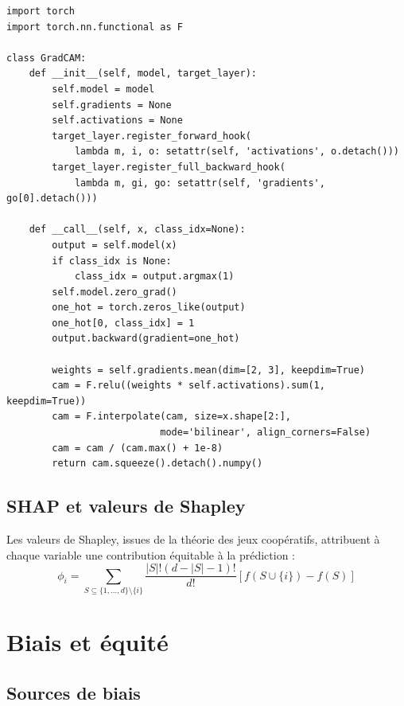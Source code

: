 \begin{codeblock}[title=\textbf{Grad-CAM en PyTorch}]
\begin{verbatim}
import torch
import torch.nn.functional as F

class GradCAM:
    def __init__(self, model, target_layer):
        self.model = model
        self.gradients = None
        self.activations = None
        target_layer.register_forward_hook(
            lambda m, i, o: setattr(self, 'activations', o.detach()))
        target_layer.register_full_backward_hook(
            lambda m, gi, go: setattr(self, 'gradients', go[0].detach()))

    def __call__(self, x, class_idx=None):
        output = self.model(x)
        if class_idx is None:
            class_idx = output.argmax(1)
        self.model.zero_grad()
        one_hot = torch.zeros_like(output)
        one_hot[0, class_idx] = 1
        output.backward(gradient=one_hot)

        weights = self.gradients.mean(dim=[2, 3], keepdim=True)
        cam = F.relu((weights * self.activations).sum(1, keepdim=True))
        cam = F.interpolate(cam, size=x.shape[2:],
                           mode='bilinear', align_corners=False)
        cam = cam / (cam.max() + 1e-8)
        return cam.squeeze().detach().numpy()
\end{verbatim}
\end{codeblock}

\subsection{SHAP et valeurs de Shapley}

Les valeurs de Shapley, issues de la th\'eorie des jeux coop\'eratifs, attribuent \`a chaque variable une contribution \'equitable \`a la pr\'ediction :
\[
\phi_i = \sum_{S \subseteq \{1,\ldots,d\} \setminus \{i\}} \frac{|S|!(d-|S|-1)!}{d!}\left[f(S \cup \{i\}) - f(S)\right]
\]

\section{Biais et \'equit\'e}
\label{sec:fairness}

\subsection{Sources de biais}

